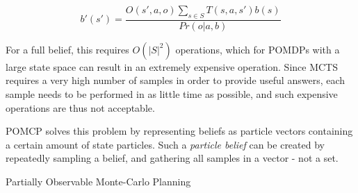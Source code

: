 \[ b'(s') = \frac{O(s', a, o)\sum_{s\in S}T(s,a,s')b(s)}{Pr(o|a,b)} \]

For a full belief, this requires $O(|S|^2)$ operations, which for POMDPs with a large state space
can result in an extremely expensive operation. Since MCTS requires a very high number of samples in
order to provide useful answers, each sample needs to be performed in as little time as possible,
and such expensive operations are thus not acceptable.

POMCP solves this problem by representing beliefs as particle vectors containing a certain amount of
state particles. Such a \textit{particle belief} can be created by repeatedly sampling a belief, and
gathering all samples in a vector - not a set.

\begin{algorithm}
    \caption{Partially Observable Monte-Carlo Planning}
\begin{multicols}{2}


    \setcounter{AlgoLine}{0}

    \setcounter{AlgoLine}{0}

\end{multicols}
\end{algorithm}

